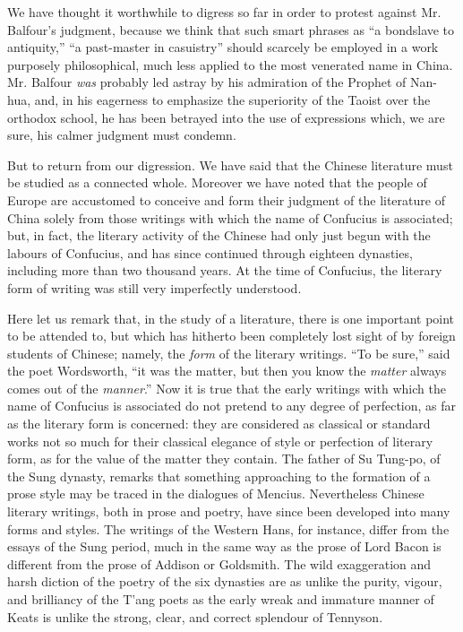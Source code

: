 We have thought it worthwhile to digress so far in order to protest against Mr. Balfour's judgment,
because we think that such smart phrases as
``a bondslave to antiquity,''
``a past-master in casuistry''
should scarcely be employed in a work purposely philosophical,
much less applied to the most venerated name in China.
Mr. Balfour \emph{was} probably led astray by his admiration of the Prophet of Nan-hua,
and, in his eagerness to emphasize the superiority of the Taoist over the orthodox school,
he has been betrayed into the use of expressions which,
we are sure, his calmer judgment must condemn.

But to return from our digression.
We have said that the Chinese literature must be studied as a connected whole.
Moreover we have noted that the people of Europe are accustomed to conceive and form their judgment of the literature of China solely from those writings with which the name of Confucius is associated;
but, in fact, the literary activity of the Chinese
had only just begun with the labours of Confucius,
and has since continued through eighteen dynasties,
including more than two thousand years.
At the time of Confucius, the literary form of writing was still very imperfectly understood.

Here let us remark that, in the study of a literature, there is one important point to be attended to,
but which has hitherto been completely lost sight of by foreign students of Chinese;
namely, the \emph{form} of the literary writings.
``To be sure,'' said the poet Wordsworth,
``it was the matter, but then you know the \emph{matter} always comes out of the \emph{manner}.''
Now it is true that the early writings with which the name of Confucius is associated do not pretend to any degree of perfection,
as far as the literary form is concerned:
they are considered as classical or standard works not so much for their classical elegance of style or perfection of literary form,
as for the value of the matter they contain.
The father of Su Tung-po, of the Sung dynasty, remarks that something approaching to the formation of a prose style may be traced in the dialogues of Mencius.
Nevertheless Chinese literary writings,
both in prose and poetry, have since been developed into many forms and styles.
The writings of the Western Hans, for instance,
differ from the essays of the Sung period, much in the same way as the prose of Lord Bacon is different from the prose of Addison or Goldsmith.
The wild exaggeration and harsh diction of the poetry of the six dynasties are as unlike the purity, vigour,
and brilliancy of the T'ang poets as the early wreak and immature manner of Keats is unlike the strong, clear, and correct splendour of Tennyson.


